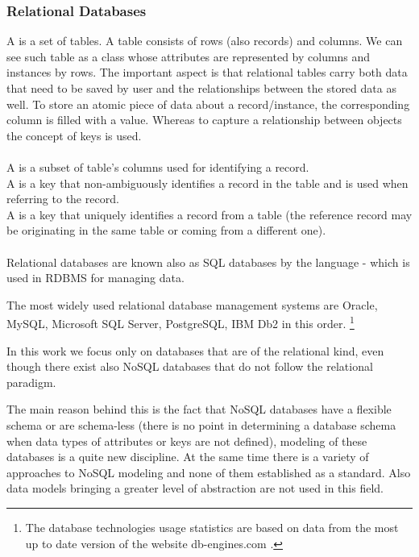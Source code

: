 \subsubsection{Relational Databases}
A  is a set of tables. A table consists of rows (also records) and columns. We can see such table as a class whose attributes are represented by columns and instances by rows.
The important aspect is that relational tables carry both data that need to be saved by user and the relationships between the stored data as well. 
To store an atomic piece of data about a record/instance, the corresponding column is filled with a value.
Whereas to capture a relationship between objects the concept of keys is used. \\ \\
A  is a subset of table's columns used for identifying a record. \\
A  is a key that non-ambiguously identifies a record in the table and is used when referring to the record. \\
A  is a key that uniquely identifies a record from a table (the reference record may be originating in the same table or coming from a different one). \\ \\
Relational databases are known also as SQL databases by the language -  which is used in RDBMS for managing data.

The most widely used relational database management systems are Oracle, MySQL, Microsoft SQL Server, PostgreSQL, IBM Db2 in this order. \footnote{The database technologies usage statistics are based on data from the most up to date version of the website db-engines.com \cite{DatabaseEnginesStatistics19}.}

In this work we focus only on databases that are of the relational kind, even though there exist also NoSQL databases that do not follow the relational paradigm. 

The main reason behind this is the fact that NoSQL databases have a flexible schema or are schema-less (there is no point in determining a database schema when data types of attributes or keys are not defined), modeling of these databases is a quite new discipline. At the same time there is a variety of approaches to NoSQL modeling and none of them established as a standard.
Also data models bringing a greater level of abstraction are not used in this field. \cite{NoSQLDatabaseModeling}

